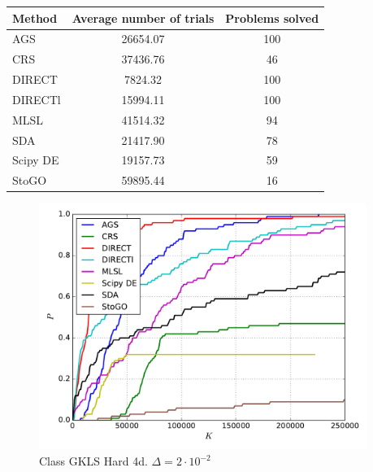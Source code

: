 \documentclass[a4paper]{article}
\begin{document}
\begin{tabular}{lcc}
\hline
 Method   &  Average number of trials  &  Problems solved  \\
\hline
 AGS      &          26654.07          &        100        \\
 CRS      &          37436.76          &        46         \\
 DIRECT   &          7824.32           &        100        \\
 DIRECTl  &          15994.11          &        100        \\
 MLSL     &          41514.32          &        94         \\
 SDA      &          21417.90          &        78         \\
 Scipy DE &          19157.73          &        59         \\
 StoGO    &          59895.44          &        16         \\
\hline
\end{tabular}
\begin{figure}[H]
  \center
  \includegraphics[width=0.95\textwidth]{../experiments/gklsh4d/cmc.pdf}
  \caption{Class GKLS Hard 4d. $\Delta=2\cdot10^{-2}$}
\end{figure}
\end{document}
